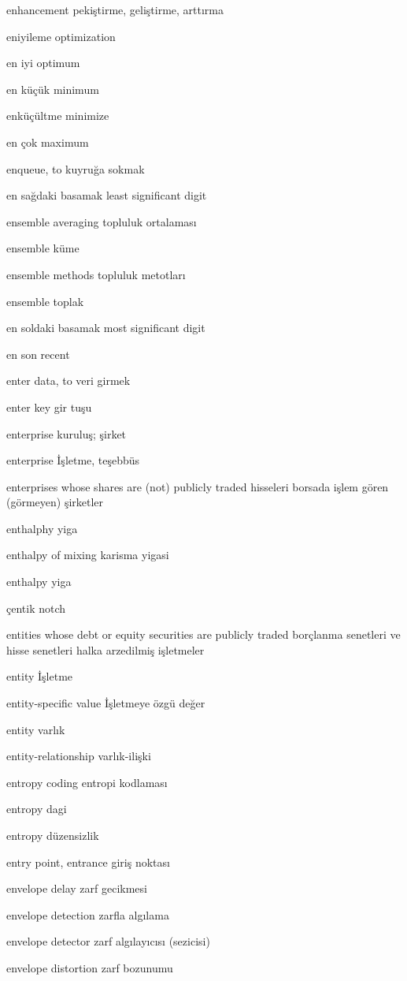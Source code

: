 \documentclass[12pt,fleqn]{article}\usepackage{../../common}
\begin{document}
enhancement pekiştirme, geliştirme, arttırma

eniyileme optimization

en iyi optimum

en küçük minimum

enküçültme minimize

en çok maximum

enqueue, to kuyruğa sokmak

en sağdaki basamak least significant digit

ensemble averaging topluluk ortalaması

ensemble küme

ensemble methods topluluk metotları

ensemble toplak

en soldaki basamak most significant digit

en son recent

enter data, to veri girmek

enter key gir tuşu

enterprise kuruluş; şirket

enterprise İşletme, teşebbüs

enterprises whose shares are (not) publicly traded hisseleri borsada işlem gören (görmeyen) şirketler

enthalphy yiga

enthalpy of mixing karisma yigasi

enthalpy yiga

çentik notch

entities whose debt or equity securities are publicly traded borçlanma senetleri ve hisse senetleri halka arzedilmiş işletmeler

entity İşletme

entity-specific value İşletmeye özgü değer

entity varlık

entity-relationship varlık-ilişki

entropy coding entropi kodlaması

entropy dagi

entropy düzensizlik

entry point, entrance giriş noktası

envelope delay zarf gecikmesi

envelope detection zarfla algılama

envelope detector zarf algılayıcısı (sezicisi)

envelope distortion zarf bozunumu
\end{document}
